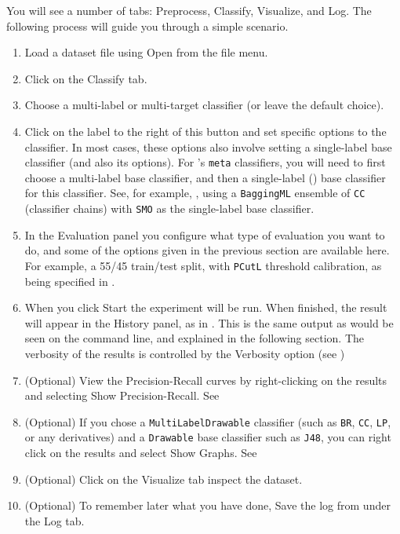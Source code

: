 \documentclass[11pt]{article}
\newcommand{\MEKA}{Meka}
\newcommand{\WEKA}{Weka}
\begin{document}
You will see a number of tabs: \textsf{Preprocess}, \textsf{Classify}, \textsf{Visualize}, and \textsf{Log}. The following process will guide you through a simple scenario.


\begin{enumerate}
	\item Load a dataset file using \textsf{Open} from the file menu. %
	\item Click on the \textsf{Classify} tab.
	\item \textsf{Choose} a multi-label or multi-target classifier (or leave the default choice).  
	\item Click on the label to the right of this button and set specific options to the classifier. In most cases, these options also involve setting a \framework{\WEKA} single-label base classifier (and also its options). For \framework{\MEKA}'s \texttt{meta} classifiers, you will need to first choose a multi-label base classifier, and then a single-label (\framework{\WEKA}) base classifier for this classifier. See, for example, , using a \texttt{BaggingML} ensemble of \texttt{CC} (classifier chains) with \texttt{SMO} as the single-label base classifier.
	\item In the \textsf{Evaluation} panel you configure what type of evaluation you want to do, and some of the options given in the previous section are available here. For example, a 55/45 train/test split, with \texttt{PCutL} threshold calibration, as being specified in .
	\item When you click \textsf{Start} the experiment will be run. When finished, the result will appear in the \textsf{History} panel, as in . This is the same output as would be seen on the command line, and explained in the following section. The verbosity of the results is controlled by the \textsf{Verbosity} option (see )
	\item (Optional) View the Precision-Recall curves by right-clicking on the results and selecting \textsf{Show Precision-Recall}. See 
	\item (Optional) If you chose a \texttt{MultiLabelDrawable} classifier (such as \texttt{BR}, \texttt{CC}, \texttt{LP}, or any derivatives) and a \texttt{Drawable} base classifier such as \texttt{J48}, you can right click on the results and select \textsf{Show Graphs}. See 
	\item (Optional) Click on the \textsf{Visualize} tab inspect the dataset.
	\item (Optional) To remember later what you have done, \textsf{Save} the log from under the \textsf{Log} tab. 
\end{enumerate}
\end{document}
